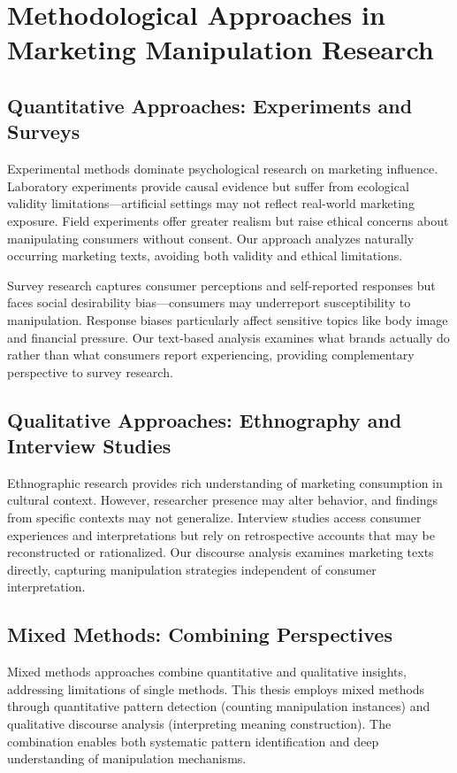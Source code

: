 \section{Methodological Approaches in Marketing Manipulation Research}
\label{sec:methods_lit}

\subsection{Quantitative Approaches: Experiments and Surveys}

Experimental methods dominate psychological research on marketing influence. Laboratory experiments provide causal evidence but suffer from ecological validity limitations—artificial settings may not reflect real-world marketing exposure. Field experiments offer greater realism but raise ethical concerns about manipulating consumers without consent. Our approach analyzes naturally occurring marketing texts, avoiding both validity and ethical limitations.

Survey research captures consumer perceptions and self-reported responses but faces social desirability bias—consumers may underreport susceptibility to manipulation. Response biases particularly affect sensitive topics like body image and financial pressure. Our text-based analysis examines what brands actually do rather than what consumers report experiencing, providing complementary perspective to survey research.

\subsection{Qualitative Approaches: Ethnography and Interview Studies}

Ethnographic research provides rich understanding of marketing consumption in cultural context. However, researcher presence may alter behavior, and findings from specific contexts may not generalize. Interview studies access consumer experiences and interpretations but rely on retrospective accounts that may be reconstructed or rationalized. Our discourse analysis examines marketing texts directly, capturing manipulation strategies independent of consumer interpretation.

\subsection{Mixed Methods: Combining Perspectives}

Mixed methods approaches combine quantitative and qualitative insights, addressing limitations of single methods. This thesis employs mixed methods through quantitative pattern detection (counting manipulation instances) and qualitative discourse analysis (interpreting meaning construction). The combination enables both systematic pattern identification and deep understanding of manipulation mechanisms.

